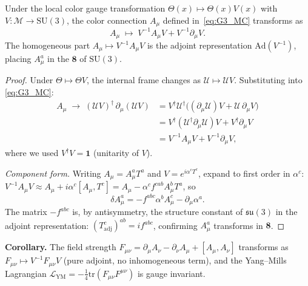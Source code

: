 \begin{tcolorbox}[colback=blue!3!white,colframe=blue!40!black,title=Theorem G.C (conditional on local SU(3) carrier symmetry)]
Under the local color gauge transformation $\Theta(x)\mapsto\Theta(x)V(x)$ with
$V:\mathcal{M}\to\mathrm{SU}(3)$, the color connection $A_\mu$ defined in~\eqref{eq:G3_MC}
transforms as
\begin{equation}
A_\mu \;\longmapsto\; V^{-1}A_\mu V + V^{-1}\partial_\mu V.
\label{eq:GC_gauge_transf}
\end{equation}
The homogeneous part $A_\mu\mapsto V^{-1}A_\mu V$ is the adjoint representation
$\mathrm{Ad}(V^{-1})$, placing $A_\mu^a$ in the $\mathbf{8}$ of $\mathrm{SU}(3)$.
\end{tcolorbox}

\begin{proof}
Under $\Theta\mapsto\Theta V$, the internal frame changes as $\mathcal{U}\mapsto\mathcal{U}V$.
Substituting into \eqref{eq:G3_MC}:
\begin{align}
A_\mu \;\to\; (\mathcal{U}V)^\dagger\,\partial_\mu(\mathcal{U}V)
&= V^\dagger\mathcal{U}^\dagger\bigl((\partial_\mu\mathcal{U})V + \mathcal{U}\,\partial_\mu V\bigr)\nonumber\\
&= V^\dagger(\mathcal{U}^\dagger\partial_\mu\mathcal{U})V + V^\dagger\partial_\mu V\nonumber\\
&= V^{-1}A_\mu V + V^{-1}\partial_\mu V,
\end{align}
where we used $V^\dagger V=\mathbf{1}$ (unitarity of $V$).

\emph{Component form.}
Writing $A_\mu = A_\mu^a T^a$ and $V = e^{i\alpha^c T^c}$, expand to first order in $\alpha^c$:
$V^{-1}A_\mu V \approx A_\mu + i\alpha^c[A_\mu, T^c] = A_\mu - \alpha^c f^{cab} A_\mu^b T^a$, so
\[
\delta A_\mu^a = -f^{abc}\alpha^b A_\mu^c - \partial_\mu\alpha^a.
\]
The matrix $-f^{abc}$ is, by antisymmetry, the structure constant of $\mathfrak{su}(3)$ in the
adjoint representation: $(T^c_{\mathrm{adj}})^{ab}=if^{abc}$, confirming $A_\mu^a$ transforms in $\mathbf{8}$.
\end{proof}

\begin{tcolorbox}[colback=blue!3!white,colframe=blue!40!black]
\textbf{Corollary.}
The field strength $F_{\mu\nu}=\partial_\mu A_\nu-\partial_\nu A_\mu+[A_\mu,A_\nu]$
transforms as $F_{\mu\nu}\mapsto V^{-1}F_{\mu\nu}V$ (pure adjoint, no inhomogeneous term),
and the Yang--Mills Lagrangian
$\mathcal{L}_{\mathrm{YM}}=-\frac{1}{4}\mathrm{tr}(F_{\mu\nu}F^{\mu\nu})$
is gauge invariant.
\end{tcolorbox}

